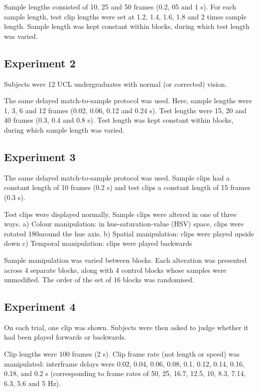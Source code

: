 \documentclass[a4paper]{article}
\begin{document}
Sample lengths consisted of 10, 25 and 50 frames (0.2, 05 and 1 s). For each sample length, test clip lengths were set at 1.2, 1.4, 1.6, 1.8 and 2 times sample length. Sample length was kept constant within blocks, during which test length was varied.



\subsection{Experiment 2}

Subjects were 12 UCL undergraduates with normal (or corrected) vision.

The same delayed match-to-sample protocol was used. Here, sample lengths were 1, 3, 6 and 12 frames (0.02, 0.06, 0.12 and 0.24 s). Test lengths were 15, 20 and 40 frames (0.3, 0.4 and 0.8 s). Test length was kept constant within blocks, during which sample length was varied.



\subsection{Experiment 3}

The same delayed match-to-sample protocol was used. Sample clips had a constant length of 10 frames (0.2 s) and test clips a constant length of 15 frames (0.3 s).

Test clips were displayed normally. Sample clips were altered in one of three ways.
	a) Colour manipulation: in hue-saturation-value (HSV) space, clips were rotated 180\degree around the hue axis.
	b) Spatial manipulation: clips were played upside down
	c) Temporal manipulation: clips were played backwards

Sample manipulation was varied between blocks. Each alteration was presented across 4 separate blocks, along with 4 control blocks whose samples were unmodified. The order of the set of 16 blocks was randomised.



\subsection{Experiment 4}

On each trial, one clip was shown. Subjects were then asked to judge whether it had been played forwards or backwards.

Clip lengths were 100 frames (2 s). Clip frame rate (not length or speed) was manipulated: interframe delays were 0.02, 0.04, 0.06, 0.08, 0.1, 0.12, 0.14, 0.16, 0.18, and 0.2 s (corresponding to frame rates of 50, 25, 16.7, 12.5, 10, 8.3, 7.14, 6.3, 5.6 and 5 Hz).
\end{document}
